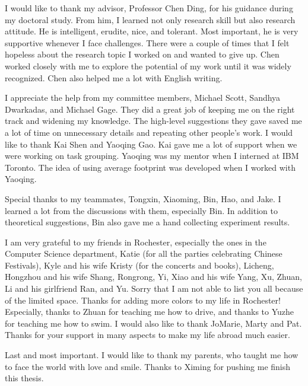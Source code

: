 \documentclass[12pt]{report}
\begin{document}
\begin{acknowledgments}
I would like to thank my advisor, Professor Chen Ding, for his
guidance during my doctoral study. From him, I learned not only
research skill but also research attitude. He is intelligent, erudite,
nice, and tolerant. Most important, he is very supportive whenever I
face challenges. There were a couple of times that I felt hopeless
about the research topic I worked on and wanted to give up. Chen worked
closely with me to explore the potential of my work until it was widely 
recognized. Chen also helped me a lot with English writing. 

I appreciate the help from my committee members, Michael Scott, Sandhya
Dwarkadas, and Michael Gage. They did a great job of keeping me on the right
track and widening my knowledge. The high-level suggestions they gave
saved me a lot of time on unnecessary details and repeating other
people's work. I would like to thank Kai Shen and Yaoqing Gao. Kai
gave me a lot of support when we were working on task grouping. Yaoqing was my mentor when I interned at IBM Toronto. The idea
of using average footprint was developed when I worked with Yaoqing. 

Special thanks to my teammates, Tongxin, Xiaoming, Bin, Hao,
and Jake. I learned a lot from the discussions with them, especially
Bin. In addition to theoretical suggestions, Bin also gave me a hand
collecting experiment results.

I am very grateful to my friends in Rochester, especially the ones
in the Computer Science department, Katie (for all the parties celebrating
Chinese Festivals), Kyle and his wife Kristy (for the concerts and
books), Licheng, Hongzhou and his wife Shang, Rongrong, Yi, Xiao and
his wife Yang, Xu, Zhuan, Li and his girlfriend Ran, and Yu. Sorry
that I am not able to list you all because of the limited
space. Thanks for adding more colors to my life in Rochester!
Especially, thanks to Zhuan for teaching me how to drive, and thanks to Yuzhe
for teaching me how to swim. I would also like to thank JoMarie, Marty
and Pat. Thanks for your support in many aspects to make my life
abroad much easier.

Last and most important. I would like to thank my parents, who taught
me how to face the world with love and smile. Thanks to Ximing for pushing
me finish this thesis. 
\end{acknowledgments}
\end{document}
